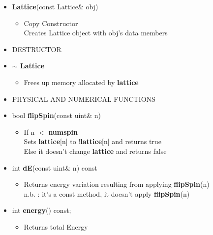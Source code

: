 \begin{itemize}
\begin{itemize}
			\item[] \textbf{Lattice}(const Lattice\& obj)		 
			\begin{itemize}
				\item[] Copy Constructor \\
						Creates Lattice object with obj's data members \\
			\end{itemize}

		
		\item[]
		DESTRUCTOR \\
		
			\item[] \textbf{$\sim$ Lattice}	 
			\begin{itemize}
				\item[] Frees up memory allocated by \textbf{lattice} \\
			\end{itemize}		
		
	
		\item[] 
		PHYSICAL AND NUMERICAL FUNCTIONS \\
 		
			\item[] bool \textbf{flipSpin}(const uint\& n)		 
			\begin{itemize}
				\item[] If n $<$ \textbf{num\textunderscore spin} \\
				Sets \textbf{lattice}[n] to !\textbf{lattice}[n] and returns true \\
				Else it doesn't change \textbf{lattice} and returns false 
						
			\end{itemize}

			\item[] int \textbf{dE}(const uint\& n) const		 
			\begin{itemize}
				\item[] Returns energy variation resulting from applying \textbf{flipSpin}(n) \\
						{\small
						\textsf{n.b.} : it's a const method, it doesn't apply \textbf{flipSpin}(n)
						} 
			\end{itemize}
			
			\item[] int \textbf{energy}() const;		 
			\begin{itemize}
				\item[] Returns total Energy 
			\end{itemize} 
			

\end{itemize}
\end{itemize}
